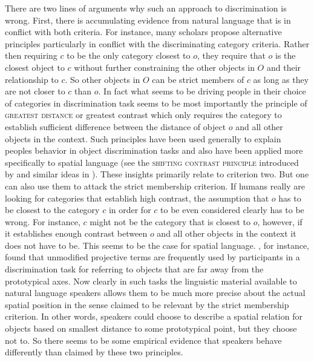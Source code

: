 There are two lines of arguments why such an approach to discrimination
is wrong. First, there is accumulating evidence from natural language that
is in conflict with both criteria. For instance, many scholars propose
alternative principles particularly in conflict with the discriminating 
category criteria. Rather then requiring $c$ to be the only category 
closest to $o$, they require that $o$ is the closest object to $c$ 
without further constraining the other objects in $O$ and their relationship
to $c$. So other objects in $O$ can be strict members of $c$ as long as they
are not closer to $c$ than $o$. In fact what seems to be driving
people in their choice of categories in discrimination task seems to be most
importantly the principle of \textsc{greatest distance} or greatest 
contrast  
which only requires the category to establish sufficient difference
between the distance of object $o$ and all other objects in the context.
Such principles have been used generally to explain peoples behavior in 
object discrimination tasks \citep{hermann1976objektbenennung}
and also have been applied more specifically to spatial language 
(see the \textsc{shifting contrast principle} introduced by 
\citealt{herskovits1986language} and similar ideas in \citealt{freksa1999links}).
These insights primarily relate to criterion two. But one can also use them 
to attack the strict membership criterion. If humans really
are looking for categories that establish high contrast, the assumption
that $o$ has to be closest to the category $c$ in order for $c$ to be
even considered clearly has to be wrong. For instance, $c$ might not
be the category that is closest to $o$, however, if it establishes enough 
contrast between $o$ and all other objects in the context it does not 
have to be. This seems to be the case for spatial language. 
\cite{tenbrink2005identifying}, for instance, found that unmodified 
projective terms are frequently used by participants in a discrimination task
for referring to objects that are far away from the prototypical axes. Now clearly
in such tasks the linguistic material available to natural language speakers 
allows them to be much more precise about the actual spatial position
in the sense claimed to be relevant by the strict membership criterion.
In other words, speakers could choose to describe a spatial relation 
for objects based on smallest distance to some prototypical point, but they
choose not to. So there seems to be some empirical evidence that
speakers behave differently than claimed by these two principles.

